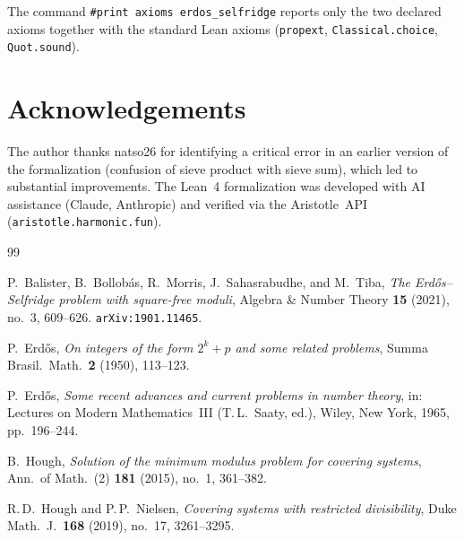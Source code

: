 \documentclass[11pt]{amsart}
\theoremstyle{definition}
\theoremstyle{remark}
\begin{document}
\noindent
The command \texttt{\#print axioms erdos\_selfridge} reports
only the two declared axioms together with the standard Lean
axioms (\texttt{propext}, \texttt{Classical.choice},
\texttt{Quot.sound}).

\section*{Acknowledgements}

The author thanks natso26 for identifying a critical error in an
earlier version of the formalization (confusion of sieve product
with sieve sum), which led to substantial improvements.
The Lean~4 formalization was developed with AI assistance
(Claude, Anthropic) and verified via
the Aristotle~API (\texttt{aristotle.harmonic.fun}).

\begin{thebibliography}{99}

P.~Balister, B.~Bollob\'as, R.~Morris, J.~Sahasrabudhe, and M.~Tiba,
\emph{The Erd\H{o}s--Selfridge problem with square-free moduli},
Algebra \& Number Theory \textbf{15} (2021), no.~3, 609--626.
\texttt{arXiv:1901.11465}.

P.~Erd\H{o}s,
\emph{On integers of the form $2^k + p$ and some related problems},
Summa Brasil.\ Math.\ \textbf{2} (1950), 113--123.

P.~Erd\H{o}s,
\emph{Some recent advances and current problems in number theory},
in: Lectures on Modern Mathematics~III (T.\,L.~Saaty, ed.),
Wiley, New York, 1965, pp.~196--244.

B.~Hough,
\emph{Solution of the minimum modulus problem for covering systems},
Ann.\ of Math.\ (2) \textbf{181} (2015), no.~1, 361--382.

R.\,D.~Hough and P.\,P.~Nielsen,
\emph{Covering systems with restricted divisibility},
Duke Math.\ J.\ \textbf{168} (2019), no.~17, 3261--3295.

\end{thebibliography}
\end{document}

